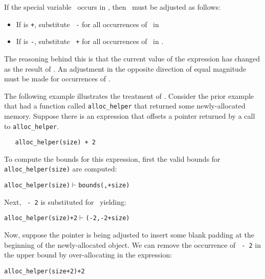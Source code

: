If the special variable \exprcurrentvalue\ occurs in
, then
\exprcurrentvalue\ must be adjusted as follows:

\begin{itemize}
\item
  If  is \texttt{+}, substitute \texttt{\exprcurrentvalue\ -}
   for all occurrences of \exprcurrentvalue\ in
\item
  If  is \texttt{-}, substitute \texttt{\exprcurrentvalue\ +}
   for all occurrences of \exprcurrentvalue\ in
  .
\end{itemize}

The reasoning behind this is that the current value of the expression has
changed as the result of  . An adjustment in the
opposite direction of equal magnitude must be made for occurrences of
\exprcurrentvalue.

The following example illustrates the treatment of
\exprcurrentvalue. Consider the prior example that had a
function called \texttt{alloc\_helper} that returned some
newly-allocated memory. Suppose there is an expression that offsets a
pointer returned by a call to \texttt{alloc\_helper}.

\begin{verbatim}
   alloc_helper(size) + 2
\end{verbatim}

To compute the bounds for this expression, first the valid bounds for
\texttt{alloc\_helper(size)} are computed:

\begin{alltt}
   alloc\_helper(size) \(\vdash\) bounds(\exprcurrentvalue, \exprcurrentvalue + size)
\end{alltt}

Next, \texttt{\exprcurrentvalue\ - 2} is substituted for
\exprcurrentvalue\, yielding:

\begin{alltt}
   alloc\_helper(size) + 2 \(\vdash\) (\exprcurrentvalue - 2, \exprcurrentvalue - 2 + size)
\end{alltt}

Now, suppose the pointer is being adjusted to insert some blank padding
at the beginning of the newly-allocated object. We can remove the
occurrence of \texttt{\exprcurrentvalue\ - 2} in the upper bound by
over-allocating in the expression:

\begin{alltt}
   alloc_helper(size + 2) + 2
\end{alltt}

